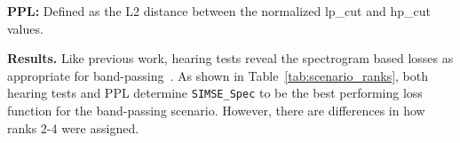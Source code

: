 \documentclass[10pt]{article} %
\newcommand{\SIMSESpec}{\texttt{SIMSE\_\allowbreak Spec}\xspace}
\begin{document}
 \noindent \textbf{PPL:} Defined as the L2 distance between the normalized lp\_cut and hp\_cut values. 

\noindent \textbf{Results.} Like previous work, hearing tests reveal the spectrogram based losses as appropriate for band-passing~\cite{salimi2025evaluating}. As shown in Table~\ref{tab:scenario_ranks}, both hearing tests and PPL determine \SIMSESpec to be the best performing loss function for the band-passing scenario. However, there are differences in how ranks 2-4 were assigned. 


\begin{table}[tbhp]
\centering
\small
\setlength{\tabcolsep}{4pt}
\renewcommand{\arraystretch}{1.15}
\caption{Summary of ranks across seven scenarios using two evaluation measures: bootstrapped PPL and bootstrapped hearing survey ratings. Lower rank indicates better performance. Top row shows ICC3 agree-ability scores between the listeners.}
\label{tab:scenario_ranks}
\end{table}
\end{document}
